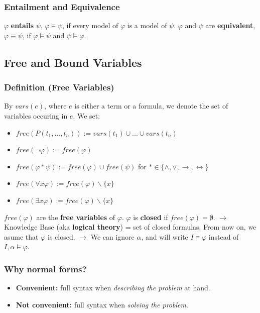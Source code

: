 \documentclass[conference, a4paper]{styles/acmsiggraph}
\begin{document}
        \subsubsection{Entailment and Equivalence}
            $\varphi$ \textbf{entails} $\psi$, $\varphi \vDash \psi$, if every model of $\varphi$ is a model of $\psi$.\newline
            $\varphi$ and $\psi$ are \textbf{equivalent}, $\varphi \equiv \psi$, if $\varphi \vDash \psi$ and $\psi \vDash \varphi$.
            
            
    \subsection{Free and Bound Variables}
        \subsubsection{Definition (Free Variables)}
            By $vars(e)$, where $e$ is either a term or a formula, we denote the set of variables occuring in $e$. We set:
            \begin{itemize}
                \item $free(P(t_1,...,t_n)) := vars(t_1) \cup ... \cup vars(t_n)$
                \item $free(\lnot \varphi) := free(\varphi)$
                \item $free(\varphi \ast \psi) := free(\varphi) \cup free(\psi)$ for $\ast \in \{\wedge,\vee,\rightarrow,\leftrightarrow\}$
                \item $free(\forall x \varphi) := free(\varphi) \backslash \{x\}$
                \item $free(\exists x \varphi) := free(\varphi) \backslash \{x\}$
            \end{itemize}
            $free(\varphi)$ are the \textbf{free variables} of $\varphi$. $\varphi$ is \textbf{closed} if $free(\varphi) = \emptyset$.\newline
            $\rightarrow$ Knowledge Base (aka \textbf{logical theory}) = set of closed formulas. From now on, we asume that $\varphi$ is closed.\newline
            $\rightarrow$ We can ignore $\alpha$, and will write $I \vDash \varphi$ instead of $I, \alpha \vDash \varphi$.
\newpage            
            
        \subsubsection{Why normal forms?}
            \begin{itemize}
                \item \textbf{Convenient:} full syntax when \textit{describing the problem} at hand.
                \item \textbf{Not convenient:} full syntax when \textit{solving the problem}.
            \end{itemize}
        
\end{document}
